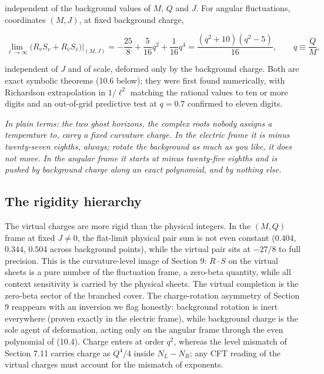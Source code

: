 \documentclass[11pt]{article}
\begin{document}
independent of the background values of $M$, $Q$ and $J$. For angular fluctuations, coordinates $(M,J)$, at fixed background charge,

\begin{equation*}
\lim_{\ell\to\infty}\bigl(R_v S_v + R_{\bar v} S_{\bar v}\bigr)\Big|_{(M,J)} = -\frac{25}{8} + \frac{5}{16}q^2 + \frac{1}{16}q^4 = \frac{(q^2+10)(q^2-5)}{16}, \qquad q \equiv \frac{Q}{M}, \tag{10.4}
\end{equation*}

independent of $J$ and of scale, deformed only by the background charge. Both are exact symbolic theorems (10.6 below); they were first found numerically, with Richardson extrapolation in $1/\ell^2$ matching the rational values to ten or more digits and an out-of-grid predictive test at $q = 0.7$ confirmed to eleven digits.

\emph{In plain terms: the two ghost horizons, the complex roots nobody assigns a temperature to, carry a fixed curvature charge. In the electric frame it is minus twenty-seven eighths, always; rotate the background as much as you like, it does not move. In the angular frame it starts at minus twenty-five eighths and is pushed by background charge along an exact polynomial, and by nothing else.}

\subsection{The rigidity hierarchy}

The virtual charges are more rigid than the physical integers. In the $(M,Q)$ frame at fixed $J \neq 0$, the flat-limit physical pair sum is not even constant ($0.404$, $0.344$, $0.504$ across background points), while the virtual pair sits at $-27/8$ to full precision. This is the curvature-level image of Section 9: $R \cdot S$ on the virtual sheets is a pure number of the fluctuation frame, a zero-beta quantity, while all context sensitivity is carried by the physical sheets. The virtual completion is the zero-beta sector of the branched cover. The charge-rotation asymmetry of Section 9 reappears with an inversion we flag honestly: background rotation is inert everywhere (proven exactly in the electric frame), while background charge is the sole agent of deformation, acting only on the angular frame through the even polynomial of (10.4). Charge enters at order $q^2$, whereas the level mismatch of Section 7.11 carries charge as $Q^4/4$ inside $N_L - N_R$; any CFT reading of the virtual charges must account for the mismatch of exponents.
\end{document}
